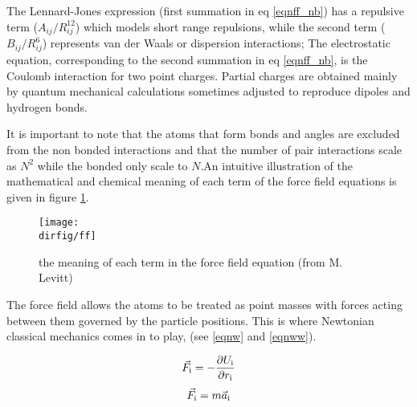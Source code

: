 \documentclass[a4paper,12pt]{article}
\newcommand{\dirfig}{./images}
\begin{document}
\begin{itemize}
The Lennard-Jones  expression (first summation in  eq \ref {eqnff_nb})
has a repulsive term ($A_{ij} / R_{ij}^{12}$) which models short range
repulsions, while  the second term (${B_{ij}  / R_{ij}^6}$) represents
van der Waals or  dispersion interactions; The electrostatic equation,
corresponding to  the second summation  in eq \ref {eqnff_nb},  is the
Coulomb  interaction  for  two  point  charges.  Partial  charges  are
obtained mainly by quantum  mechanical calculations sometimes adjusted
to reproduce dipoles and hydrogen bonds.
\end{itemize}
It is important to note that the atoms that form bonds and angles
are excluded from the non bonded interactions and that the number 
of pair interactions scale as
$N^2$ while the bonded only scale to $N$.\newline An intuitive
illustration of the mathematical and chemical meaning of each term
of the force field equations is given in figure \ref {FF}.
\newpage

\begin{figure}[!ht]
\begin{center}
\texttt{[image: \\dirfig/ff]}
\caption{\label{FF} the meaning of each term in the force field equation (from M. Levitt)}
\end{center}
\end{figure}

The force  field allows the atoms  to be treated as  point masses with
forces acting between them governed by the particle positions. This is
where Newtonian classical mechanics comes  in to play, (see \ref{eqnw}
and \ref{eqnww}).

\def\eqnw{\vec F_{\rm i} = -{\partial U_{\rm i} \over \partial r_{\rm i}}
\label {eqnw}}
\begin{equation}
\eqnw{}
\end{equation}
\def\eqnww{\vec F_{\rm i} = {m \vec a_{\rm i}}
\label {eqnww}}
\begin{equation}
\eqnww{}
\end{equation}
\end{document}
